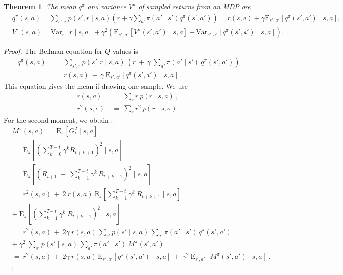 \documentclass{article}
\newtheorem{theoremA}{Theorem}
\newcommand\EXP{\mathbf{\mathrm{E}}}
\newcommand\VAR{\mathbf{\mathrm{Var}}}
\begin{document}
\begin{appendices}
\begin{theoremA}
  \label{th:Avar}
  The mean  $q^\pi$ and variance $V^{\pi}$ 
  of sampled returns from an MDP are
\begin{align} \nonumber
  &q^\pi(s,a) =   \sum_{s',r} p(s',r\mid s,a) 
  \left(r + \gamma \sum_{a'} \pi(a' \mid s')  q^\pi(s',a')
  \right) =   r(s,a)  +  \gamma 
  \EXP_{s',a'} \left[q^\pi(s', a') \mid s,a\right] , \\ \label{eq:Avarq}
  &V^{\pi}(s,a) = \VAR_r \left[ r \mid s,a \right]  +  \gamma^2   \left(
    \EXP_{s',a'}  \left[V^{\pi}(s',a') \mid s,a\right]
  +   \VAR_{s',a'} \left[q^\pi(s', a') \mid s,a\right]  \right)  .  
\end{align}
\end{theoremA}

\begin{proof}
\label{proof:Avar}
The Bellman equation for $Q$-values is
\begin{align}
  q^\pi(s,a) \ &= \  \sum_{s',r} p(s',r\mid s,a) \ 
  \left(r \ + \ \gamma \ \sum_{a'} \pi(a' \mid s') \ q^\pi(s',a')  \right) \\
  \nonumber &= \
  r(s,a) \ + \ \gamma \
  \EXP_{s',a'} \left[q^\pi(s', a') \mid s,a\right]\ . 
\end{align}
This equation gives the mean if drawing one sample.
We use
\begin{align}
  r(s,a) \ &= \ \sum_{r} r \ p(r \mid s,a) \ , \\
  r^2(s,a) \ &= \ \sum_{r} r^2 \ p(r \mid s,a) \ . 
\end{align}
For the second moment, we obtain \cite{Tamar:12}:
\begin{align}
  \label{eq:secM}
  &M^{\pi}(s,a) \ = \ \EXP_{\pi} \left[ G_t^2 \mid s, a \right]
  \\ \nonumber &= \ 
  \EXP_{\pi} \left[ \left( \sum_{k=0}^{T-t} \gamma^k  R_{t+k+1} \right)^2 \mid s, a \right]
  \\ \nonumber &= \ 
  \EXP_{\pi} \left[ \left( R_{t+1} \ + \ \sum_{k=1}^{T-t} \gamma^k
      \ R_{t+k+1} \right)^2 \mid s, a \right]
  \\ \nonumber &= \ 
  r^2(s,a) \ + \ 2 \ r(s,a)\ \EXP_{\pi} \left[  \sum_{k=1}^{T-t} \gamma^k
      \ R_{t+k+1}  \mid s, a \right] \\ \nonumber
  &+ \ 
  \EXP_{\pi} \left[ \left(\sum_{k=1}^{T-t} \gamma^k
      \ R_{t+k+1} \right)^2 \mid s, a \right] 
  \\ \nonumber &= \ 
  r^2(s,a)  \ + \ 2 \gamma  \ r(s,a) \ \sum_{s'} p(s'\mid s,a) \ \sum_{a'}
  \pi(a' \mid s') \ q^\pi(s',a') \\\nonumber
  &+ \ \gamma^2  \  \sum_{s'} p(s'\mid s,a) \ \sum_{a'}
  \pi(a' \mid s') \ M^{\pi}(s',a') 
  \\ \nonumber &= \ 
  r^2(s,a)  \ + \ 2 \gamma  \ r(s,a)  \   \EXP_{s',a'} \left[ q^\pi(s',a')\mid s,a\right]
  \ + \ \gamma^2  \  \EXP_{s',a'} \left[M^{\pi}(s',a') \mid s,a\right] \ .
\end{align}



\end{proof}
\end{appendices}
\end{document}
